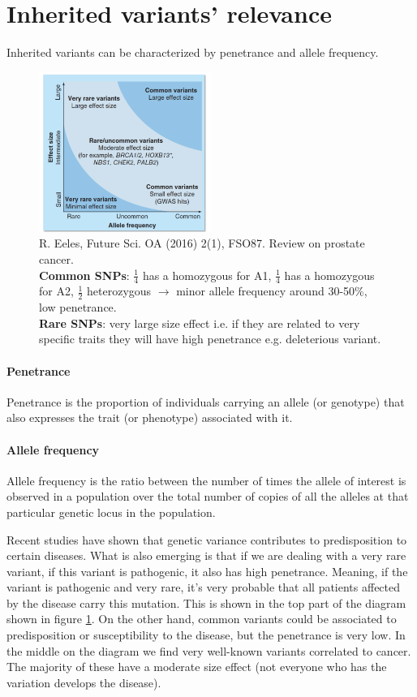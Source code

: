 \section{Inherited variants' relevance}
Inherited variants can be characterized by penetrance and allele frequency.

\begin{figure}[htbp!]
    \centering
    \includegraphics[width=0.5\textwidth]{relevance.png}
    \caption{R. Eeles, Future Sci. OA (2016) 2(1), FSO87. Review on prostate cancer.\\
   \textbf{ Common SNPs}: $\frac{1}{4}$ has a homozygous for A1, $\frac{1}{4}$ has a homozygous for A2, $\frac{1}{2}$ heterozygous $\rightarrow$ minor allele frequency around 30-50\%, low penetrance.\\
\textbf{Rare SNPs}: very large size effect i.e. if they are related to very specific traits they will have high penetrance e.g. deleterious variant.
}
    \label{fig:relevance}
\end{figure}

\paragraph*{Penetrance}
Penetrance is the proportion of individuals carrying an allele (or genotype) that also expresses the trait (or phenotype) associated with it.

\paragraph*{Allele frequency}
Allele frequency is the ratio between the number of times the allele of interest is observed in a population over the total number of copies of all the alleles at that particular genetic locus in the population.
			
Recent studies have shown that genetic variance contributes to predisposition to certain diseases. 
What is also emerging is that if we are dealing with a very rare variant, if this variant is pathogenic, it also has high penetrance.
Meaning, if the variant is pathogenic and very rare, it's very probable that all patients affected by the disease carry this mutation. This is shown in the top part of the diagram shown in figure \ref{fig:relevance}.
On the other hand, common variants could be associated to predisposition or susceptibility to the disease, but the penetrance is very low. 
In the middle on the diagram we find very well-known variants correlated to cancer. The majority of these have a moderate size effect (not everyone who has the variation develops the disease).

